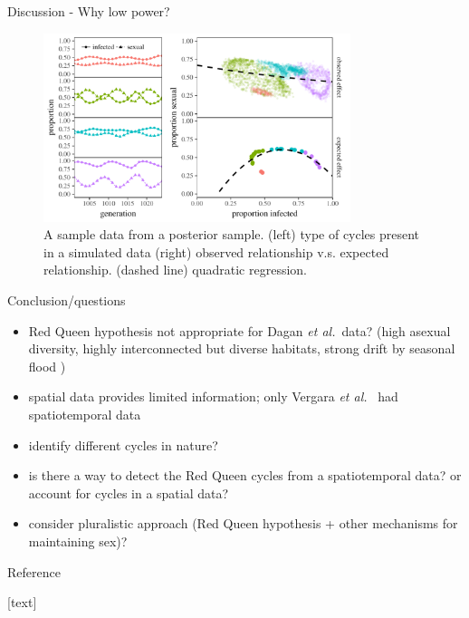 \documentclass{beamer}
\newcommand{\etal}{\emph{et al.}}
\begin{document}
\begin{frame}{Discussion - Why low power?}
\begin{figure}
\includegraphics[width=0.8\textwidth]{../fig/cycle_example.pdf}
\caption{A sample data from a posterior sample. (left) type of cycles present in a simulated data (right) observed relationship v.s. expected relationship. (dashed line) quadratic regression.}
\vspace{-1em}
\end{figure}
\end{frame}

\begin{frame}{Conclusion/questions}
\begin{itemize}
    \item Red Queen hypothesis not appropriate for Dagan \etal\ data? (high asexual diversity, highly interconnected but diverse habitats, strong drift by seasonal flood \cite{ben2007temporal})
    \item spatial data provides limited information; only Vergara \etal\ \cite{vergara2014infection} had spatiotemporal data
    \item identify different cycles in nature?
    \item is there a way to detect the Red Queen cycles from a spatiotemporal data? or account for cycles in a spatial data?
    \item consider pluralistic approach (Red Queen hypothesis + other mechanisms for maintaining sex)?
\end{itemize}
\end{frame}

\begin{frame}{Reference}
\tiny{
[text]


}
\end{frame}
    
\end{document}
